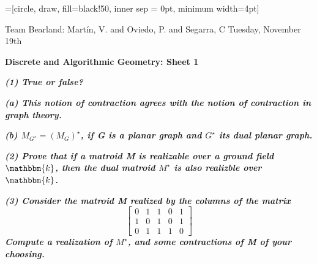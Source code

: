 \documentclass[a4paper, 10pt]{article}
\theoremstyle{definition} %
\begin{document}
=[circle, draw, fill=black!50, inner sep = 0pt, minimum width=4pt]

Team Bearland: Mart\'in, V. and Oviedo, P. and Segarra, C \hfill Tuesday, November 19th

\vspace{15pt}

\textbf{\Large Discrete and Algorithmic Geometry: Sheet 1}

\vspace{20pt}

\textbf{\textit{(1) True or false?}}

\vspace{3pt}

\hspace{5pt} \textbf{\textit{(a) This notion of contraction agrees with the notion of contraction in graph theory.}}

\vspace{3pt}


\begin{figure}[h!]
    \centering
\end{figure}

\hspace{5pt} \textbf{\textit{(b) $M_{G^\star} = \left(M_G\right)^\star$, if G is a planar graph and $G^\star$ its dual planar graph.}}

\vspace{10pt}

\textbf{\textit{(2) Prove that if a matroid M is realizable over a ground field $\mathbbm{k}$, then the dual matroid $M^\star$ is also realizble over $\mathbbm{k}$.}}

\vspace{10pt}

\textbf{\textit{(3) Consider the matroid M realized by the columns of the matrix}}
$$
\left[
    \begin{array}{ccccc}
        0 & 1 & 1 & 0 & 1 \\
        1 & 0 & 1 & 0 & 1 \\
        0 & 1 & 1 & 1 & 0
    \end{array}
\right]
$$
\textbf{\textit{ Compute a realization of $M^\star$, and some contractions of M of your choosing.}}

\begin{figure}[h!]
    \centering
\end{figure}
\end{document}
